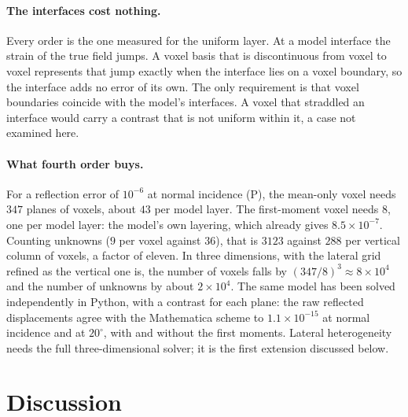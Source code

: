 \documentclass[extra,mreferee]{gji}
\begin{document}
\paragraph{The interfaces cost nothing.} Every order is the one measured for the uniform layer. At a
model interface the strain of the true field jumps. A voxel basis that is discontinuous from voxel
to voxel represents that jump exactly when the interface lies on a voxel boundary, so the interface
adds no error of its own. The only requirement is that voxel boundaries coincide with the model's interfaces. A voxel
that straddled an interface would carry a contrast that is not uniform within it, a case not
examined here.

\paragraph{What fourth order buys.} For a reflection error of $10^{-6}$ at normal incidence (P), the
mean-only voxel needs $347$ planes of voxels, about $43$ per model layer. The first-moment voxel needs
$8$, one per model layer: the model's own layering, which already gives $8.5\times10^{-7}$. Counting
unknowns ($9$ per voxel against $36$), that is $3123$ against $288$ per vertical column of voxels, a
factor of eleven. In three dimensions, with the lateral grid refined as the vertical one is, the
number of voxels falls by $(347/8)^3\approx8\times10^4$ and the number of unknowns by about $2\times10^4$.
The same model has been solved independently in Python, with a contrast for each plane: the raw
reflected displacements agree with the Mathematica scheme to $1.1\times10^{-15}$ at normal incidence
and at $20^\circ$, with and without the first moments. Lateral
heterogeneity needs the full three-dimensional solver; it is the first extension discussed below.

\section{Discussion}\label{sec:discussion}
\end{document}
